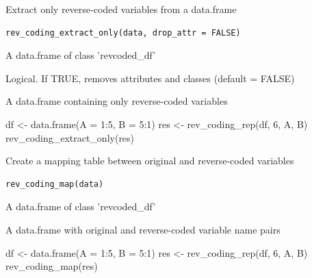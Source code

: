 \documentclass[a4paper]{book}
\begin{document}
%
\begin{Description}
Extract only reverse-coded variables from a data.frame
\end{Description}
%
\begin{Usage}
\begin{verbatim}
rev_coding_extract_only(data, drop_attr = FALSE)
\end{verbatim}
\end{Usage}
%
\begin{Arguments}
\begin{ldescription}
\item[\code{data}] A data.frame of class 'revcoded\_df'

\item[\code{drop\_attr}] Logical. If TRUE, removes attributes and classes (default = FALSE)
\end{ldescription}
\end{Arguments}
%
\begin{Value}
A data.frame containing only reverse-coded variables
\end{Value}
%
\begin{Examples}
\begin{ExampleCode}
df <- data.frame(A = 1:5, B = 5:1)
res <- rev_coding_rep(df, 6, A, B)
rev_coding_extract_only(res)
\end{ExampleCode}
\end{Examples}

%
\begin{Description}
Create a mapping table between original and reverse-coded variables
\end{Description}
%
\begin{Usage}
\begin{verbatim}
rev_coding_map(data)
\end{verbatim}
\end{Usage}
%
\begin{Arguments}
\begin{ldescription}
\item[\code{data}] A data.frame of class 'revcoded\_df'
\end{ldescription}
\end{Arguments}
%
\begin{Value}
A data.frame with original and reverse-coded variable name pairs
\end{Value}
%
\begin{Examples}
\begin{ExampleCode}
df <- data.frame(A = 1:5, B = 5:1)
res <- rev_coding_rep(df, 6, A, B)
rev_coding_map(res)
\end{ExampleCode}
\end{Examples}
\end{document}
